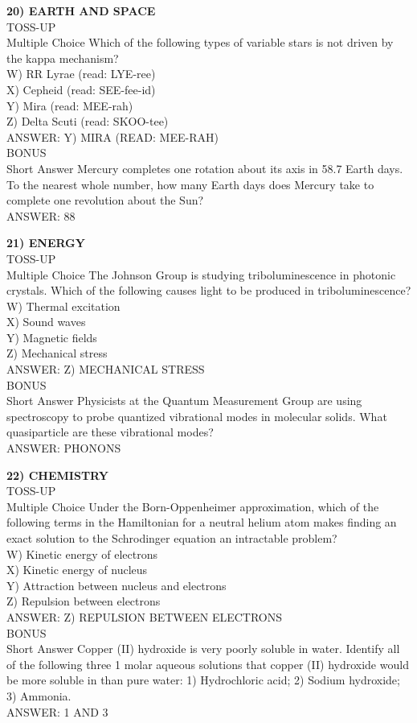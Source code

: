 \documentclass{article}
\begin{document}
\noindent \textbf{20) EARTH AND SPACE} \\
TOSS-UP \\
Multiple Choice Which of the following types of variable stars is not driven by the kappa mechanism? \\
W) RR Lyrae (read: LYE-ree) \\
X) Cepheid (read: SEE-fee-id) \\
Y) Mira (read: MEE-rah) \\
Z) Delta Scuti (read: SKOO-tee) \\
ANSWER: Y) MIRA (READ: MEE-RAH) \\
BONUS \\
Short Answer Mercury completes one rotation about its axis in 58.7 Earth days. To the nearest whole number, how many Earth days does Mercury take to complete one revolution about the Sun? \\
ANSWER: 88

\noindent \textbf{21) ENERGY} \\
TOSS-UP \\
Multiple Choice The Johnson Group is studying triboluminescence in photonic crystals. Which of the following causes light to be produced in triboluminescence? \\
W) Thermal excitation \\
X) Sound waves \\
Y) Magnetic fields \\
Z) Mechanical stress \\
ANSWER: Z) MECHANICAL STRESS \\
BONUS \\
Short Answer Physicists at the Quantum Measurement Group are using spectroscopy to probe quantized vibrational modes in molecular solids. What quasiparticle are these vibrational modes? \\
ANSWER: PHONONS

\noindent \textbf{22) CHEMISTRY} \\
TOSS-UP \\
Multiple Choice Under the Born-Oppenheimer approximation, which of the following terms in the Hamiltonian for a neutral helium atom makes finding an exact solution to the Schrodinger equation an intractable problem? \\
W) Kinetic energy of electrons \\
X) Kinetic energy of nucleus \\
Y) Attraction between nucleus and electrons \\
Z) Repulsion between electrons \\
ANSWER: Z) REPULSION BETWEEN ELECTRONS \\
BONUS \\
Short Answer Copper (II) hydroxide is very poorly soluble in water. Identify all of the following three 1 molar aqueous solutions that copper (II) hydroxide would be more soluble in than pure water: 1) Hydrochloric acid; 2) Sodium hydroxide; 3) Ammonia. \\
ANSWER: 1 AND 3
\end{document}
